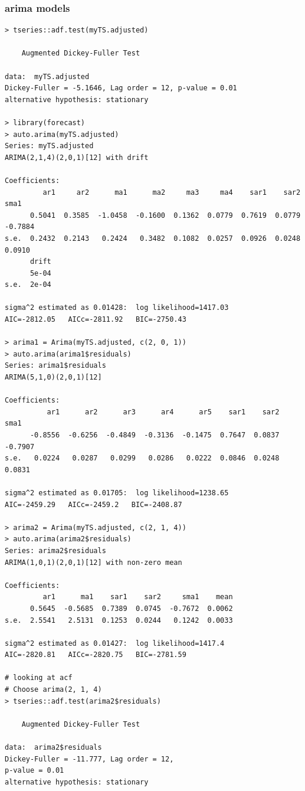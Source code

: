 \documentclass[a4paper,11pt]{article}
\begin{document}
\subsubsection{arima models}
\begin{verbatim}
> tseries::adf.test(myTS.adjusted)

	Augmented Dickey-Fuller Test

data:  myTS.adjusted
Dickey-Fuller = -5.1646, Lag order = 12, p-value = 0.01
alternative hypothesis: stationary

> library(forecast)
> auto.arima(myTS.adjusted)
Series: myTS.adjusted 
ARIMA(2,1,4)(2,0,1)[12] with drift         

Coefficients:
         ar1     ar2      ma1      ma2     ma3     ma4    sar1    sar2     sma1
      0.5041  0.3585  -1.0458  -0.1600  0.1362  0.0779  0.7619  0.0779  -0.7884
s.e.  0.2432  0.2143   0.2424   0.3482  0.1082  0.0257  0.0926  0.0248   0.0910
      drift
      5e-04
s.e.  2e-04

sigma^2 estimated as 0.01428:  log likelihood=1417.03
AIC=-2812.05   AICc=-2811.92   BIC=-2750.43

> arima1 = Arima(myTS.adjusted, c(2, 0, 1))
> auto.arima(arima1$residuals)
Series: arima1$residuals 
ARIMA(5,1,0)(2,0,1)[12]                    

Coefficients:
          ar1      ar2      ar3      ar4      ar5    sar1    sar2     sma1
      -0.8556  -0.6256  -0.4849  -0.3136  -0.1475  0.7647  0.0837  -0.7907
s.e.   0.0224   0.0287   0.0299   0.0286   0.0222  0.0846  0.0248   0.0831

sigma^2 estimated as 0.01705:  log likelihood=1238.65
AIC=-2459.29   AICc=-2459.2   BIC=-2408.87

> arima2 = Arima(myTS.adjusted, c(2, 1, 4))
> auto.arima(arima2$residuals)
Series: arima2$residuals 
ARIMA(1,0,1)(2,0,1)[12] with non-zero mean 

Coefficients:
         ar1      ma1    sar1    sar2     sma1    mean
      0.5645  -0.5685  0.7389  0.0745  -0.7672  0.0062
s.e.  2.5541   2.5131  0.1253  0.0244   0.1242  0.0033

sigma^2 estimated as 0.01427:  log likelihood=1417.4
AIC=-2820.81   AICc=-2820.75   BIC=-2781.59

# looking at acf
# Choose arima(2, 1, 4)
> tseries::adf.test(arima2$residuals)

	Augmented Dickey-Fuller Test

data:  arima2$residuals
Dickey-Fuller = -11.777, Lag order = 12,
p-value = 0.01
alternative hypothesis: stationary


\end{verbatim}
\end{document}

